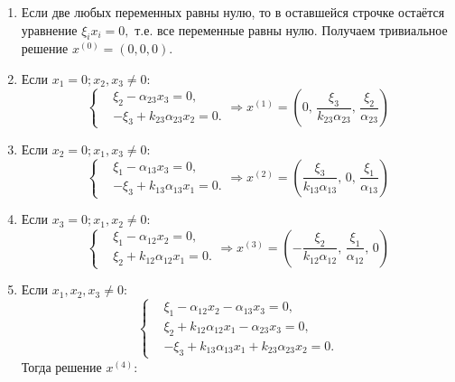     \begin{enumerate}
        \item Если две любых переменных равны нулю, то в оставшейся строчке остаётся уравнение \( \xi_i x_i = 0, \) т.е. все переменные равны нулю. Получаем тривиальное решение \( x^{(0)} = (0,0,0) \).
        \item Если \( x_1 = 0; x_2, x_3 \neq 0 \):
            \[
                \left\{\begin{split}
                    & \xi_2 - \alpha_{23} x_3 = 0, \\
                    & -\xi_3 + k_{23} \alpha_{23} x_2 = 0. 
                \end{split}\right.
                \Rightarrow
                x^{(1)} = \left( 0,\, \frac{\xi_3}{k_{23} \alpha_{23}},\, \frac{\xi_2}{\alpha_{23}} \right)
            \]
        \item Если \( x_2 = 0; x_1, x_3 \neq 0 \):
            \[
                \left\{\begin{split}
                    & \xi_1 - \alpha_{13} x_3 = 0, \\
                    & -\xi_3 + k_{13} \alpha_{13} x_1 = 0. 
                \end{split}\right.
                \Rightarrow
                x^{(2)} = \left( \frac{\xi_3}{k_{13} \alpha_{13}},\, 0,\, \frac{\xi_1}{\alpha_{13}} \right)
            \]
        \item Если \( x_3 = 0; x_1, x_2 \neq 0 \):
            \[
                \left\{\begin{split}
                    & \xi_1 - \alpha_{12} x_2 = 0, \\
                    & \xi_2 + k_{12} \alpha_{12} x_1 = 0. 
                \end{split}\right.
                \Rightarrow
                x^{(3)} = \left( -\frac{\xi_2}{k_{12} \alpha_{12}},\, \frac{\xi_1}{\alpha_{12}},\, 0 \right)
            \]
        \item Если \( x_1, x_2, x_3 \neq 0 \):
            \[
                \left\{\begin{split}
                    & \xi_1 - \alpha_{12} x_2 - \alpha_{13} x_3 = 0, \\
                    & \xi_2 + k_{12} \alpha_{12} x_1 - \alpha_{23} x_3 = 0, \\
                    & -\xi_3 + k_{13} \alpha_{13} x_1 + k_{23} \alpha_{23} x_2 = 0. 
                \end{split}\right.
            \]
            Тогда решение \( x^{(4)} \):

\end{enumerate}
